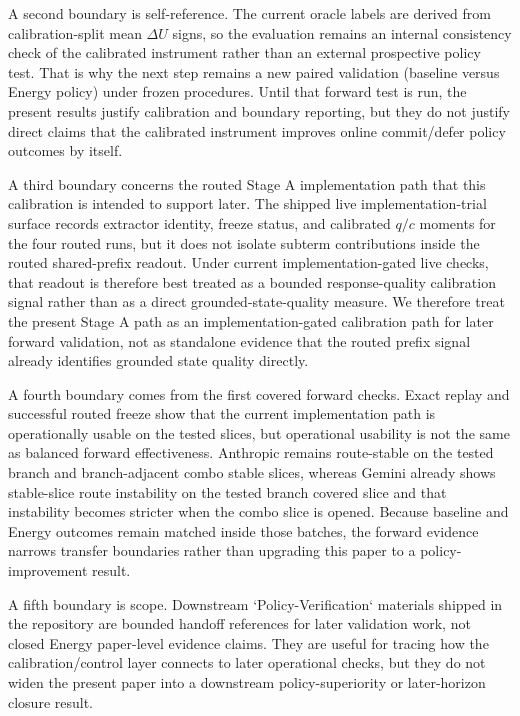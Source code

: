 \documentclass[11pt,a4paper]{article}
\begin{document}
A second boundary is self-reference. The current oracle labels are derived from calibration-split mean $\Delta U$ signs, so the evaluation remains an internal consistency check of the calibrated instrument rather than an external prospective policy test. That is why the next step remains a new paired validation (baseline versus Energy policy) under frozen procedures. Until that forward test is run, the present results justify calibration and boundary reporting, but they do not justify direct claims that the calibrated instrument improves online commit/defer policy outcomes by itself.

A third boundary concerns the routed Stage A implementation path that this calibration is intended to support later. The shipped live implementation-trial surface records extractor identity, freeze status, and calibrated \(q/c\) moments for the four routed runs, but it does not isolate subterm contributions inside the routed shared-prefix readout. Under current implementation-gated live checks, that readout is therefore best treated as a bounded response-quality calibration signal rather than as a direct grounded-state-quality measure. We therefore treat the present Stage A path as an implementation-gated calibration path for later forward validation, not as standalone evidence that the routed prefix signal already identifies grounded state quality directly.

A fourth boundary comes from the first covered forward checks. Exact replay and successful routed freeze show that the current implementation path is operationally usable on the tested slices, but operational usability is not the same as balanced forward effectiveness. Anthropic remains route-stable on the tested branch and branch-adjacent combo stable slices, whereas Gemini already shows stable-slice route instability on the tested branch covered slice and that instability becomes stricter when the combo slice is opened. Because baseline and Energy outcomes remain matched inside those batches, the forward evidence narrows transfer boundaries rather than upgrading this paper to a policy-improvement result.

A fifth boundary is scope. Downstream `Policy-Verification` materials shipped in the repository are bounded handoff references for later validation work, not closed Energy paper-level evidence claims. They are useful for tracing how the calibration/control layer connects to later operational checks, but they do not widen the present paper into a downstream policy-superiority or later-horizon closure result.
\end{document}
